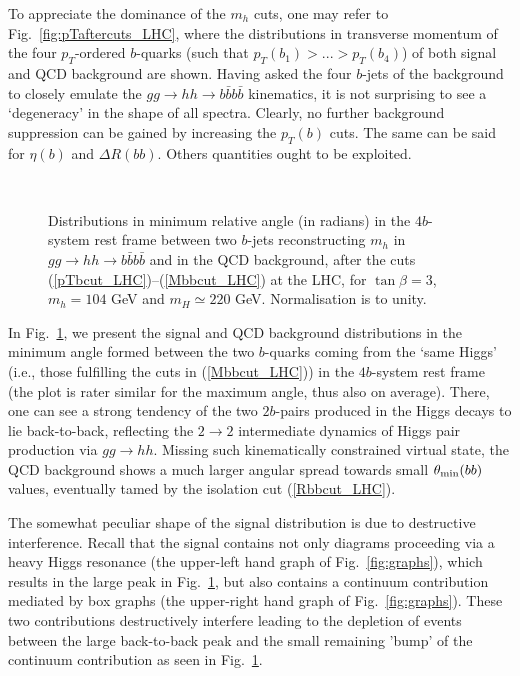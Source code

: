 To appreciate the dominance of the $m_h$ cuts, one may refer to
Fig.~\ref{fig:pTaftercuts_LHC}, where the distributions in transverse
momentum of the four $p_T$-ordered $b$-quarks (such that $p_{T}(b_1)>
... >p_{T}(b_4)$) of both signal and QCD background are shown.  Having
asked the four $b$-jets of the background to closely emulate the
$gg\to hh\to b\bar b b\bar b$ kinematics, it is not surprising to see
a `degeneracy' in the shape of all spectra. Clearly, no
further background suppression can be gained by increasing the
$p_T(b)$ cuts. The same can be said for $\eta({b})$ and $\Delta
R({bb})$. Others quantities ought to be exploited.

\begin{figure}[!ht]
  ~\hskip2.5cm
\caption{Distributions in minimum  relative angle (in radians)
  in the $4b$-system rest frame between two $b$-jets
  reconstructing $m_h$ in $gg\to hh\to b\bar b b\bar b$ and in the QCD
  background, after the cuts (\ref{pTbcut_LHC})--(\ref{Mbbcut_LHC}) at
  the LHC, for $\tan\beta=3$, $m_h=104$ GeV and $m_H\simeq220$ GeV.
  Normalisation is to unity.}
\label{fig:thetabb_LHC}
\vspace*{-3mm}
\end{figure}

In Fig.~\ref{fig:thetabb_LHC}, we present the signal and QCD
background distributions in the minimum angle formed between the
two $b$-quarks coming from the `same Higgs' (i.e., those fulfilling
the cuts in (\ref{Mbbcut_LHC})) in the $4b$-system rest frame (the
plot is rater similar for the maximum angle, thus also on average).
There, one can see a strong tendency of the two $2b$-pairs produced in
the Higgs decays to lie back-to-back, reflecting the $2\to2$
intermediate dynamics of Higgs pair production via $gg\to hh$. Missing
such kinematically constrained virtual state, the QCD background shows
a much larger angular spread towards small $\theta_{\rm{min}}(bb)$
values, eventually tamed by the isolation cut (\ref{Rbbcut_LHC}).

The somewhat peculiar shape of the signal distribution is due to
destructive interference.  Recall that the signal contains not only
diagrams proceeding via a heavy Higgs resonance (the upper-left hand
graph of Fig.~\ref{fig:graphs}), which results in the large peak in
Fig.~\ref{fig:thetabb_LHC}, but also contains a continuum contribution
mediated by box graphs (the upper-right hand graph of
Fig.~\ref{fig:graphs}). These two contributions destructively
interfere leading to the depletion of events between the large
back-to-back peak and the small remaining 'bump' of the continuum
contribution as seen in Fig.~\ref{fig:thetabb_LHC}.

